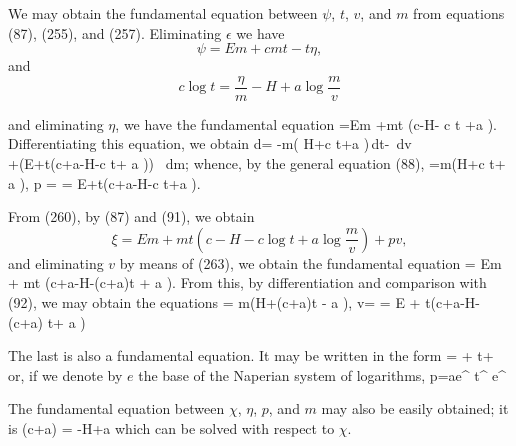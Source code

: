 \documentclass[12pt]{memoir}
\begin{document}
We may obtain the fundamental equation between $\psi$, $t$, $v$, and $m$ from equations (87), (255), and (257). Eliminating $\epsilon$ we have
$$\psi = Em + cmt - t\eta,$$
and                 $$c \log t =\frac{\eta}{m} -H + a \log \frac{m}{v}$$

and eliminating $\eta$, we have the fundamental equation
\eqs \psi =Em +mt \left(c-H- c \log t +a \log {}  \right). \label{260}\eqe
Differentiating this equation, we obtain
\eqs d\psi = -m\left( H+c \log t+a \log {}\right)\,dt-  \,dv\\
+\left(E+t\left(c+a-H-c \log t+ a \log {}\right)\right) \, dm; \label{261}\eqe
whence, by the general equation (88),
\eqs \eta=m\left(H+c \log t+ a \log {}\right), \label{262}\eqe
\eqs p =  \label{263}\eqe
\eqs \mu = E+t\left(c+a-H-c \log t+a \log {} \right).  \label{264}\eqe

From (260), by (87) and (91), we obtain
$$ \xi = E m + mt \left(c-H -c \log t+ a \log \frac{m}{v} \right) +pv,$$
and eliminating $v$ by means of (263), we obtain the fundamental equation
\eqs \xi = Em + mt \left(c+a-H-(c+a)\log t + a \log{} \right).  \label{265}\eqe
From this, by differentiation and comparison with (92), we may obtain the equations
\eqs \eta = m\left(H+(c+a)\log t - a \log {}\right),  \label{266}\eqe
\eqs v=       \label{267}\eqe
\eqs \mu = E + t\left(c+a-H-(c+a) \log t+ a \log {}\right)  \label{268}\eqe


The last is also a fundamental equation. It may be written in the form
\eqs \log{}=   +  \log t+  \label{269}\eqe
or, if we denote by $e$ the base of the Naperian system of logarithms,
\eqs
p=ae^{} t^{} e^{} \label{270}\eqe


The fundamental equation between $\chi$, $\eta$, $p$, and $m$ may also be
easily obtained; it is
\eqs (c+a) \log {} =  -H+a \log {} \label{271}\eqe
which can be solved with respect to $\chi$.
\end{document}
